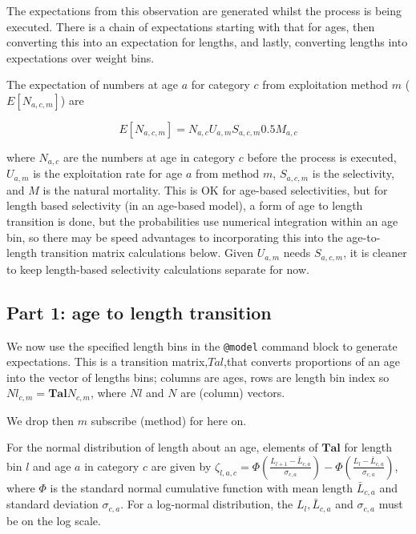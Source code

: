 \documentclass[a4paper,11pt,twoside,pdftex,draft]{article}
\begin{document}
The expectations from this observation are generated whilst the process is being executed. There is a chain of expectations starting with that for ages, then converting this into an expectation for lengths, and lastly, converting lengths into expectations over weight bins.

The expectation of numbers at age $a$ for category $c$ from exploitation method $m$ ($E[N_{a,c,m}]$) are

\begin{equation}
E[N_{a,c,m}] = N_{a,c} U_{a,m} S_{a,c,m} 0.5 M_{a,c}
\end{equation}

where $N_{a,c}$ are the numbers at age in category $c$ before the process is executed, $U_{a,m}$ is the exploitation rate for age $a$ from method $m$, $S_{a,c,m}$ is the selectivity, and $M$ is the natural mortality. This is OK for age-based selectivities, but for length based selectivity (in an age-based model), a form of age to length transition is done, but the probabilities use numerical integration within an age bin, so there may be speed advantages to incorporating this into the age-to-length transition matrix calculations below. Given $U_{a,m}$ needs $S_{a,c,m} $, it is cleaner to keep length-based selectivity calculations separate for now.


\subsection{Part 1: age to length transition}
We now use the specified length bins in the \texttt{@model} command block to generate expectations. This is a transition matrix,\boldmath$Tal$,that converts proportions of an age into the vector of  lengths bins; columns are ages, rows are length bin index so $Nl_{c,m} = \mathbf{Tal} N_{c,m}$, where $Nl$ and $N$ are (column) vectors.

We drop then $m$ subscribe (method) for here on.

For the normal distribution of length about an age, 
elements of $\mathbf{Tal}$ for length bin $l$ and age $a$ in category $c$ are given by $\zeta_{l,a,c} = \Phi\left( \frac{L_{l+1} - \bar L_{c,a}   }{\sigma_{c,a}} \right)   - \Phi\left( \frac{L_{l} - \bar L_{c,a}   }{\sigma_{c,a}} \right)  $,
where $\Phi$ is the standard normal cumulative function with mean length $\bar L_{c,a}$ and standard deviation $\sigma_{c,a}$. For a log-normal distribution, the $L_{l}, \bar L_{c,a}$ and $\sigma_{c,a}$ must be on the log scale.
\end{document}
